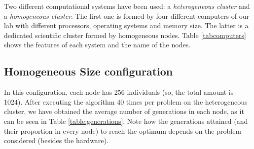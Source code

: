 \documentclass[final,1p,times]{elsarticle}
\begin{document}
Two different computational systems have been used: a {\em heterogeneous cluster} and a {\em homogeneous cluster}. The first one is formed by four different computers of our lab with different processors, operating systems and memory size. The latter is a dedicated scientific cluster formed by homogeneous nodes. Table \ref{tabcomputers} shows the features of each system and the name of the nodes.

\begin{table}
\end{table}

\subsection{Homogeneous Size configuration}

In this configuration, each node has 256 individuals (so, the total amount is 1024). After executing the algorithm 40 times per problem on the heterogeneous cluster, we have obtained the average number of generations in each node, as it can be seen in Table \ref{table:generations}. Note how the generations attained (and their proportion in every node) to reach the optimum depends on the problem considered (besides the hardware).
\end{document}

